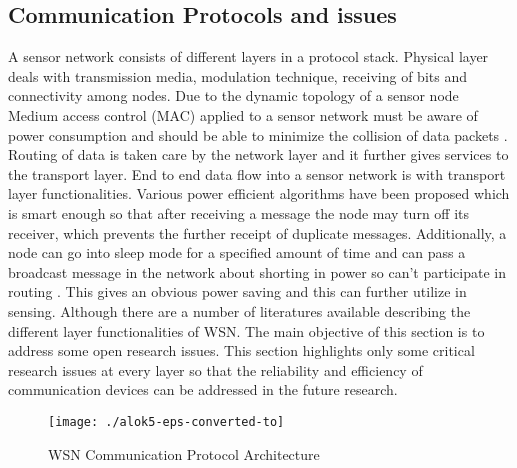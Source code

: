 \documentclass[12pt,journal,communications surveys and tutorials]{IEEEtran}
\begin{document}
\subsection{Communication Protocols and issues}
A sensor network consists of different layers in a protocol stack. Physical layer deals with transmission media, modulation technique, receiving of bits and connectivity among nodes. Due to the dynamic topology of a sensor node Medium access control (MAC) applied to a sensor network must be aware of power consumption and should be able to minimize the collision of data packets \cite{yick2008wireless}. Routing of data is taken care by the network layer and it further gives services to the transport layer. End to end data flow into a sensor network is with transport layer functionalities. Various power efficient algorithms have been proposed which is smart enough so that after receiving a message the node may turn off its receiver, which prevents the further receipt of duplicate messages. Additionally, a node can go into sleep mode for a specified amount of time and can pass a broadcast message in the network about shorting in power so can’t participate in routing \cite{yick2008wireless,akyildiz2002wireless}. This gives an obvious power saving and this can further utilize in sensing. Although there are a number of literatures available describing the different layer functionalities of WSN. The main objective of this section is to address some open research issues. This section highlights only some critical research issues at every layer so that the reliability and efficiency of communication devices can be addressed in the future research.
\begin{figure}[b]
\centering
\texttt{[image: ./alok5-eps-converted-to]}
\caption{WSN Communication Protocol Architecture}
\label{fig:alok5-eps-converted-to}
\end{figure}
\end{document}
